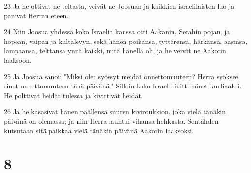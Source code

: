 \par 23 Ja he ottivat ne teltasta, veivät ne Joosuan ja kaikkien israelilaisten luo ja panivat Herran eteen.
\par 24 Niin Joosua yhdessä koko Israelin kanssa otti Aakanin, Serahin pojan, ja hopean, vaipan ja kultalevyn, sekä hänen poikansa, tyttärensä, härkänsä, aasinsa, lampaansa, telttansa ynnä kaikki, mitä hänellä oli, ja he veivät ne Aakorin laaksoon.
\par 25 Ja Joosua sanoi: "Miksi olet syössyt meidät onnettomuuteen? Herra syöksee sinut onnettomuuteen tänä päivänä." Silloin koko Israel kivitti hänet kuoliaaksi. He polttivat heidät tulessa ja kivittivät heidät.
\par 26 Ja he kasasivat hänen päällensä suuren kiviroukkion, joka vielä tänäkin päivänä on olemassa; ja niin Herra lauhtui vihansa hehkusta. Sentähden kutsutaan sitä paikkaa vielä tänäkin päivänä Aakorin laaksoksi.

\chapter{8}

